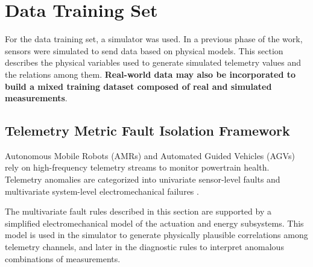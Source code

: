 \section{Data Training Set}
\label{sec:training_set}
For the data training set, a simulator was used. In a previous phase of the work, sensors were simulated to send data based on physical models. This section describes the physical variables used to generate simulated telemetry values and the relations among them. \textbf{Real-world data may also be incorporated to build a mixed training dataset composed of real and simulated measurements}.

\subsection{Telemetry Metric Fault Isolation Framework}

Autonomous Mobile Robots (AMRs) and Automated Guided Vehicles (AGVs) rely on high-frequency telemetry streams to monitor powertrain health. Telemetry anomalies are categorized into univariate sensor-level faults and multivariate system-level electromechanical failures \cite{Pillai2024Taxonomy}.

The multivariate fault rules described in this section are supported by a simplified electromechanical model of the actuation and energy subsystems. This model is used in the simulator to generate physically plausible correlations among telemetry channels, and later in the diagnostic rules to interpret anomalous combinations of measurements.

